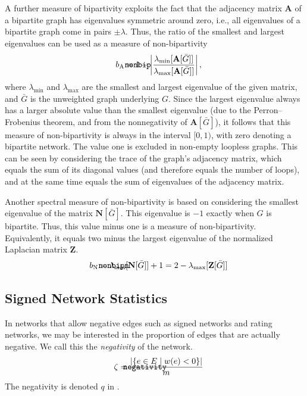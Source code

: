 \documentclass{article}
\def\mathnote#1{%
  \tag*{\rlap{\hspace\marginparsep\smash{\parbox[t]{\marginparwidth}{#1}}}}
}
\begin{document}
A further measure of bipartivity exploits the fact that the adjacency
matrix $\mathbf A$ of a bipartite graph has eigenvalues symmetric around
zero, i.e., all eigenvalues of a bipartite graph come in pairs $\pm
\lambda$. Thus, the ratio of the smallest and largest eigenvalues can be
used as a measure of non-bipartivity
\begin{align}
  \mathnote{\texttt{nonbip}} b_{\mathrm A} &= 1 - \left| \frac
             {\lambda_{\min}[\mathbf A[\bar G]]} {\lambda_{\max}[\mathbf
                 A[\bar G]]} \right|,
\end{align}
where $\lambda_{\min}$ and $\lambda_{\max}$ are the smallest and largest
eigenvalue of the given matrix, and $\bar G$ is the unweighted graph
underlying $G$.  Since the largest eigenvalue always has a larger
absolute value than the smallest eigenvalue (due to the
Perron--Frobenius theorem, and from the nonnegativity of $\mathbf A[\bar
  G]$), it follows that this measure of non-bipartivity is always in the
interval $[0,1)$, with zero denoting a bipartite network.  The value one
is excluded in non-empty loopless graphs.  This can be seen by
considering the trace of the graph's adjacency matrix, which equals the
sum of its diagonal values (and therefore equals the number of loops),
and at the same time equals the sum of eigenvalues of the adjacency
matrix. 

Another spectral measure of non-bipartivity is based on considering the
smallest eigenvalue of the matrix $\mathbf N[\bar G]$.  This eigenvalue
is $-1$ exactly when $G$ is bipartite.  Thus, this value minus one is a
measure of non-bipartivity. Equivalently, it equals two minus the
largest eigenvalue of the normalized Laplacian matrix $\mathbf Z$.
\begin{align}
  \mathnote{\texttt{nonbipn}} b_{\mathrm N} &= \lambda_{\min}[\mathbf
    N[\bar G]] + 1 = 2 - \lambda_{\max}[\mathbf Z[\bar G]]
\end{align}

\subsection{Signed Network Statistics}
In networks that allow negative edges such as signed networks and rating
networks, we may be interested in the proportion of edges that are
actually negative.  We call this the \emph{negativity} of the network. 
\begin{align}
  \mathnote{\texttt{negativity}}
  \zeta &= \frac { | \{ e \in E \mid w(e) < 0 \} | } {m}
\end{align}
The negativity is denoted $q$ in \citep{b868}. 
\end{document}
